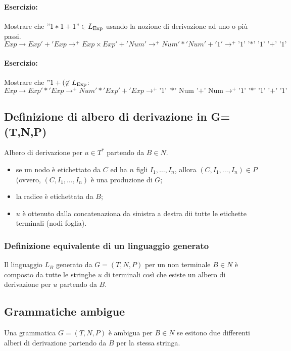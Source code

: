 \paragraph{Esercizio:}
Mostrare che $"1*1+1"\in L_{\text{Exp}}$ usando la nozione di
derivazione ad uno o più passi.
\[
  Exp\rightarrow Exp'+'Exp\rightarrow^+ Exp\times Exp'+'Num'
  \rightarrow^+ Num'*'Num'+'1'
  \rightarrow^+ \text{'1' '*' '1' '+' '1'}
\]
\paragraph{Esercizio:}
Mostrare che $"1+(\not\in L_{\text{Exp}}$:
\[
  Exp\rightarrow Exp '*' Exp\rightarrow^+ Num '*' Exp '+' Exp \rightarrow^+
\text{'1' '*' Num '+' Num}\rightarrow^+\text{'1' '*' '1' '+' '1'}
\]

\subsection{Definizione di albero di derivazione in G=(T,N,P)}
Albero di derivazione per $u\in T^*$ partendo da $B\in N$.
\begin{itemize}
  \item se un nodo è etichettato da $C$ ed ha $n$ figli $I_1,\dots,I_n$,
    allora $(C,I_1,\dots,I_n)\in P$ (ovvero, $(C,I_1,\dots,I_n)$ è una
    produzione di $G$;
  \item la radice è etichettata da $B$;
  \item $u$ è ottenuto dalla concatenaziona da sinistra a destra dii tutte le
    etichette terminali (nodi foglia).
\end{itemize}

\subsubsection{Definizione equivalente di un linguaggio generato}
Il linguaggio $L_B$ generato da $G=(T,N,P)$ per un non terminale $B\in N$ è
composto da tutte le stringhe $u$ di terminali così che esiste un albero di
derivazione per $u$ partendo da $B$.

\subsection{Grammatiche ambigue}
\begin{theorem}
  Una grammatica $G=(T,N,P)$ è ambigua per $B\in N$ se esitono due differenti
  alberi di derivazione partendo da $B$ per la stessa stringa.
\end{theorem}

